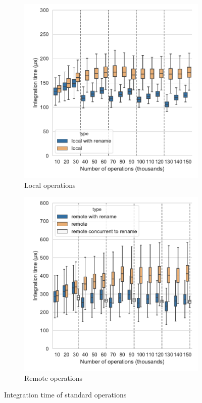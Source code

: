 \documentclass[sigplan,10pt]{acmart}
\begin{document}
\begin{figure}[ht!]
    \begin{subfigure}{\columnwidth}
        \centering
        \includegraphics[width=0.9\columnwidth]{img/integration-time-boxplot-local-operations-without-outliers.pdf}
        \caption{Local operations}
        \label{fig:evolution-integration-time-local-insert-remove}
    \end{subfigure}
    \begin{subfigure}{\columnwidth}
        \centering
        \includegraphics[width=0.9\columnwidth]{img/integration-time-boxplot-remote-operations-without-outliers.pdf}
        \caption{Remote operations}
        \label{fig:evolution-integration-time-remote-insert-remove}
    \end{subfigure}
    \caption{Integration time of standard operations}
    \label{fig:evolution-integration-time-insert-remove}
\end{figure}
\end{document}
